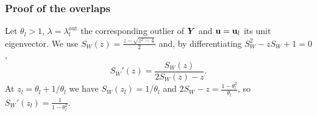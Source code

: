 \subsubsection{Proof of the overlaps}\label{proof:BBP_k_overlaps}

Let $\theta_l>1$, $\lambda=\lambda^{\mathrm{out}}_l$ the corresponding outlier of $\bm{Y}$ and $\boldsymbol{\mathbf{u}}=\boldsymbol{\mathbf{u}}_l$ its unit eigenvector. We use $S_W(z)=\frac{z-\sqrt{z^2-4}}{2}$ and, by differentiating $S_W^2-zS_W+1=0$,
\[
S_W'(z)=\frac{S_W(z)}{2S_W(z)-z}.
\]
At $z_l=\theta_l+1/\theta_l$ we have $S_W(z_l)=1/\theta_l$ and $2S_W-z=\frac{1-\theta_l^2}{\theta_l}$, so $S_W'(z_l)=\frac1{1-\theta_l^2}$.

